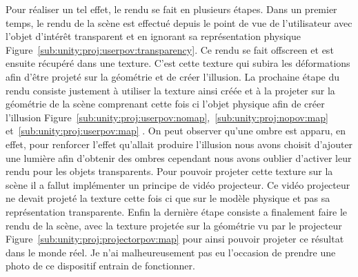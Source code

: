 Pour réaliser un tel effet, le rendu se fait en plusieurs étapes. Dans un premier temps, le rendu de la scène est effectué depuis le point de vue de l'utilisateur avec l'objet d'intérêt transparent et en ignorant sa représentation physique Figure~\ref{sub:unity:proj:userpov:transparency}. Ce rendu se fait offscreen et est ensuite récupéré dans une texture. C'est cette texture qui subira les déformations afin d'être projeté sur la géométrie et de créer l'illusion. La prochaine étape du rendu consiste justement à utiliser la texture ainsi créée et à la projeter sur la géométrie de la scène comprenant cette fois ci l'objet physique afin de créer l'illusion Figure~\ref{sub:unity:proj:userpov:nomap},~\ref{sub:unity:proj:nopov:map} et~\ref{sub:unity:proj:userpov:map} . On peut observer qu'une ombre est apparu, en effet, pour renforcer l'effet qu'allait produire l'illusion nous avons choisit d'ajouter une lumière afin d'obtenir des ombres cependant nous avons oublier d'activer leur rendu pour les objets transparents. Pour pouvoir projeter cette texture sur la scène il a fallut implémenter un principe de vidéo projecteur. Ce vidéo projecteur ne devait projeté la texture cette fois ci que sur le modèle physique et pas sa représentation transparente.
Enfin la dernière étape consiste a finalement faire le rendu de la scène, avec la texture projetée sur la géométrie vu par le projecteur Figure~\ref{sub:unity:proj:projectorpov:map} pour ainsi pouvoir projeter ce résultat dans le monde réel. Je n'ai malheureusement pas eu l'occasion de prendre une photo de ce dispositif entrain de fonctionner.
